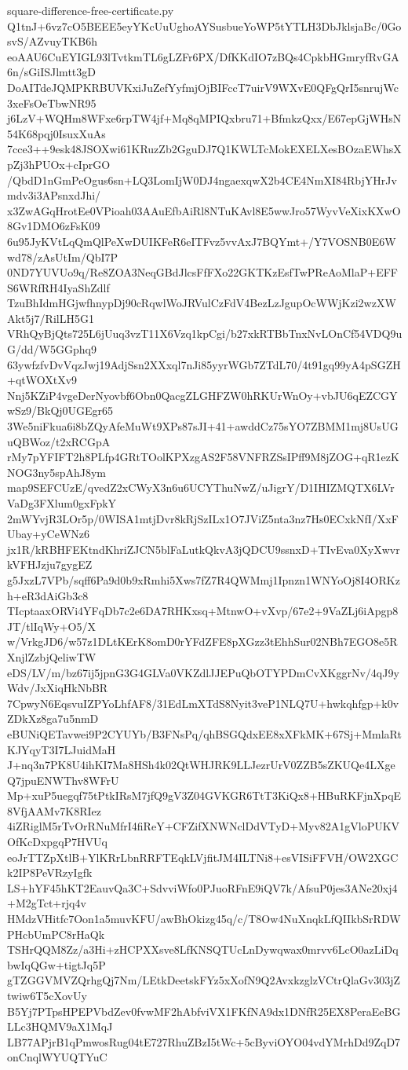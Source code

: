 \documentclass[11pt]{article}
\theoremstyle{definition}
\theoremstyle{remark}
\begin{document}
\begin{filecontents*}[overwrite]{square-difference-free-certificate.py}
Q1tnJ+6vz7cO5BEEE5eyYKcUuUghoAYSusbueYoWP5tYTLH3DbJklsjaBc/0GosvS/AZvuyTKB6h
eoAAU6CuEYIGL93lTvtkmTL6gLZFr6PX/DfKKdIO7zBQs4CpkbHGmryfRvGA6n/sGiISJlmtt3gD
DoAITdeJQMPKRBUVKxiJuZefYyfmjOjBIFccT7uirV9WXvE0QFgQrI5snrujWc3xeFsOeTbwNR95
j6LzV+WQHm8WFxe6rpTW4jf+Mq8qMPIQxbru71+BfmkzQxx/E67epGjWHsN54K68pqj0IsuxXuAs
7cce3++9esk48JSOXwi61KRuzZb2GguDJ7Q1KWLTcMokEXELXesBOzaEWhsXpZj3hPUOx+cIprGO
/QbdD1nGmPeOgus6sn+LQ3LomIjW0DJ4ngaexqwX2b4CE4NmXI84RbjYHrJvmdv3i3APsnxdJhi/
x3ZwAGqHrotEe0VPioah03AAuEfbAiRl8NTuKAvl8E5wwJro57WyvVeXixKXwO8Gv1DMO6zFsK09
6u95JyKVtLqQmQlPeXwDUIKFeR6eITFvz5vvAxJ7BQYmt+/Y7VOSNB0E6Wwd78/zAsUtIm/QbI7P
0ND7YUVUo9q/Re8ZOA3NeqGBdJlcsFfFXo22GKTKzEsfTwPReAoMlaP+EFFS6WRfRH4IyaShZdlf
TzuBhIdmHGjwfhnypDj90cRqwlWoJRVulCzFdV4BezLzJgupOcWWjKzi2wzXWAkt5j7/RilLH5G1
VRhQyBjQts725L6jUuq3vzT11X6Vzq1kpCgi/b27xkRTBbTnxNvLOnCf54VDQ9uG/dd/W5GGphq9
63ywfzfvDvVqzJwj19AdjSsn2XXxql7nJi85yyrWGb7ZTdL70/4t91gq99yA4pSGZH+qtWOXtXv9
Nnj5KZiP4vgeDerNyovbf6Obn0QacgZLGHFZW0hRKUrWnOy+vbJU6qEZCGYwSz9/BkQj0UGEgr65
3We5niFkua6i8bZQyAfeMuWt9XPs87sJI+41+awddCz75sYO7ZBMM1mj8UsUGuQBWoz/t2xRCGpA
rMy7pYFIFT2h8PLfp4GRtTOolKPXzgAS2F58VNFRZSsIPff9M8jZOG+qR1ezKNOG3ny5spAhJ8ym
map9SEFCUzE/qvedZ2xCWyX3n6u6UCYThuNwZ/uJigrY/D1IHIZMQTX6LVrVaDg3FXlum0gxFpkY
2mWYvjR3LOr5p/0WISA1mtjDvr8kRjSzILx1O7JViZ5nta3nz7Hs0ECxkNfI/XxFUbay+yCeWNz6
jx1R/kRBHFEKtndKhriZJCN5blFaLutkQkvA3jQDCU9ssnxD+TIvEva0XyXwvrkVFHJzju7gygEZ
g5JxzL7VPb/sqff6Pa9d0b9xRmhi5Xws7fZ7R4QWMmj1Ipnzn1WNYoOj8I4ORKzh+eR3dAiGb3c8
TIcptaaxORVi4YFqDb7c2e6DA7RHKxsq+MtnwO+vXvp/67e2+9VaZLj6iApgp8JT/tlIqWy+O5/X
w/VrkgJD6/w57z1DLtKErK8omD0rYFdZFE8pXGzz3tEhhSur02NBh7EGO8e5RXnjlZzbjQeliwTW
eDS/LV/m/bz67ij5jpnG3G4GLVa0VKZdlJJEPuQbOTYPDmCvXKggrNv/4qJ9yWdv/JxXiqHkNbBR
7CpwyN6EqsvuIZPYoLhfAF8/31EdLmXTdS8Nyit3veP1NLQ7U+hwkqhfgp+k0vZDkXz8ga7u5nmD
eBUNiQETavwei9P2CYUYb/B3FNsPq/qhBSGQdxEE8xXFkMK+67Sj+MmlaRtKJYqyT3I7LJuidMaH
J+nq3n7PK8U4ihKI7Ma8HSh4k02QtWHJRK9LLJezrUrV0ZZB5sZKUQe4LXgeQ7jpuENWThv8WFrU
Mp+xuP5uegqf75tPtkIRsM7jfQ9gV3Z04GVKGR6TtT3KiQx8+HBuRKFjnXpqE8VfjAAMv7K8RIez
4iZRiglM5rTvOrRNuMfrI4fiReY+CFZifXNWNclDdVTyD+Myv82A1gVloPUKVOfKcDxpgqP7HVUq
eoJrTTZpXtlB+YlKRrLbnRRFTEqkLVjfitJM4ILTNi8+esVISiFFVH/OW2XGCk2IP8PeVRzyIgfk
LS+hYF45hKT2EauvQa3C+SdvviWfo0PJuoRFnE9iQV7k/AfsuP0jes3ANe20xj4+M2gTct+rjq4v
HMdzVHitfc7Oon1a5muvKFU/awBhOkizg45q/c/T8Ow4NuXnqkLfQIIkbSrRDWPHcbUmPC8rHaQk
TSHrQQM8Zz/a3Hi+zHCPXXsve8LfKNSQTUcLnDywqwax0mrvv6LcO0azLiDqbwIqQGw+tigtJq5P
gTZGGVMVZQrhgQj7Nm/LEtkDeetskFYz5xXofN9Q2AvxkzglzVCtrQlaGv303jZtwiw6T5cXovUy
B5Yj7PTpsHPEPVbdZev0fvwMF2hAbfviVX1FKfNA9dx1DNfR25EX8PeraEeBGLLc3HQMV9aX1MqJ
LB77APjrB1qPmwosRug04tE727RhuZBzI5tWc+5cByviOYO04vdYMrhDd9ZqD7onCnqlWYUQTYuC

\end{filecontents*}
\end{document}
